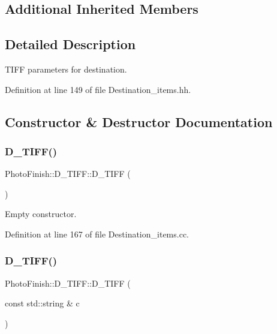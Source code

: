 \subsection*{Additional Inherited Members}


\subsection{Detailed Description}
T\+I\+FF parameters for destination. 

Definition at line 149 of file Destination\+\_\+items.\+hh.



\subsection{Constructor \& Destructor Documentation}
\mbox{\label{class_photo_finish_1_1_d___t_i_f_f_adc4f367566d37ab98ee231914892293e}} 
\subsubsection{\texorpdfstring{D\+\_\+\+T\+I\+F\+F()}{D\_TIFF()}\hspace{0.1cm}{\footnotesize\ttfamily [1/2]}}
{\footnotesize\ttfamily Photo\+Finish\+::\+D\+\_\+\+T\+I\+F\+F\+::\+D\+\_\+\+T\+I\+FF (\begin{DoxyParamCaption}{ }\end{DoxyParamCaption})}



Empty constructor. 



Definition at line 167 of file Destination\+\_\+items.\+cc.

\mbox{\label{class_photo_finish_1_1_d___t_i_f_f_a9e693e5c8fd373710a1d84f8c930f8b5}} 
\subsubsection{\texorpdfstring{D\+\_\+\+T\+I\+F\+F()}{D\_TIFF()}\hspace{0.1cm}{\footnotesize\ttfamily [2/2]}}
{\footnotesize\ttfamily Photo\+Finish\+::\+D\+\_\+\+T\+I\+F\+F\+::\+D\+\_\+\+T\+I\+FF (\begin{DoxyParamCaption}\item[{const std\+::string \&}]{c }\end{DoxyParamCaption})}



